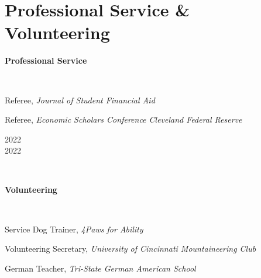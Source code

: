 \section{Professional Service \& Volunteering}
\begin{minipage}{.75\linewidth} \begin{flushleft}
    		\textbf{Professional Service}
    	\end{flushleft} \end{minipage}
     \\
     \vspace{1pt}
     \begin{minipage}{.75\linewidth} \begin{flushleft}
    		\begin{description}[font=$\bullet$]
      \vspace{0pt}
	        \item{Referee, \textit{Journal of Student Financial Aid}}
            \vspace{-6pt}
            \item{Referee, \textit{Economic Scholars Conference Cleveland Federal Reserve}}
            \end{description}
    	\end{flushleft} \end{minipage}
    \hfill 
    \begin{minipage}{.20\linewidth}\begin{flushright}
        2022 \\
        2022
    	\end{flushright}\end{minipage}
\\
\vspace{7pt}
\begin{minipage}{.75\linewidth} \begin{flushleft}
    		\textbf{Volunteering}
    	\end{flushleft} \end{minipage}
     \\
     \vspace{1pt}
     \begin{minipage}{.75\linewidth} \begin{flushleft}
    		\begin{description}[font=$\bullet$]
      \vspace{0pt}
	        \item{Service Dog Trainer, \textit{4Paws for Ability}}
            \vspace{-6pt}
            \item{Volunteering Secretary, \textit{University of Cincinnati Mountaineering Club}}
            \vspace{-6pt}
            \item{German Teacher, \textit{Tri-State German American School}}
            \end{description}
    	\end{flushleft} \end{minipage}
